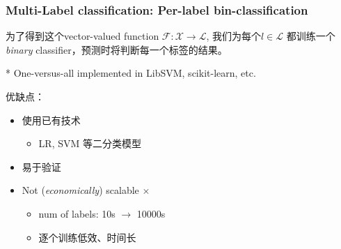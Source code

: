 \documentclass{beamer}
\begin{document}
\begin{frame}
\frametitle{Multi-Label classification: Per-label bin-classification}

为了得到这个vector-valued function $\mathcal{F} : \mathcal{X} \rightarrow \mathcal{L}$, 我们为每个$\mathit{l} \in \mathcal{L}$ 都训练一个\textit{binary} classifier，预测时将判断每一个标签的结果。

* {\small \color{gray} One-versus-all implemented in LibSVM, scikit-learn, etc.}

\pause

优缺点：
\begin{itemize}
\item 使用已有技术 {  \color{green} \checkmark}
  \begin{itemize}
  \item LR, SVM 等二分类模型
  \end{itemize}
\item 易于验证 {  \color{green} \checkmark}
\item Not (\textit{economically}) scalable  {  \color{red} $\times$}
  \begin{itemize}
  \item num of labels: 10s $\rightarrow$ 10000s 
  \item 逐个训练低效、时间长
  \end{itemize}
\end{itemize}
\end{frame}
\end{document}
